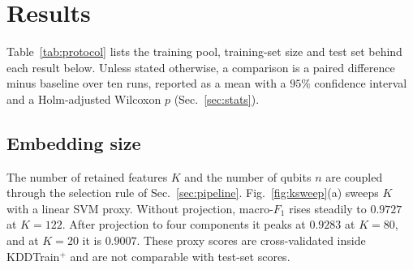 \section{Results}\label{sec:results}

Table~\ref{tab:protocol} lists the training pool, training-set size and test set behind each
result below. Unless stated otherwise, a comparison is a paired difference \QSVM{} minus
baseline over ten runs, reported as a mean with a $95\%$ confidence interval and a
Holm-adjusted Wilcoxon $p$ (Sec.~\ref{sec:stats}).

\subsection{Embedding size}\label{sec:res-embed}




The number of retained features $K$ and the number of qubits $n$ are coupled through the
selection rule of Sec.~\ref{sec:pipeline}. Fig.~\ref{fig:ksweep}(a) sweeps $K$ with a linear SVM
proxy. Without projection, macro-$F_1$ rises steadily to $0.9727$ at $K=122$. After projection to
four components it peaks at $0.9283$ at $K=80$, and at $K=20$ it is $0.9007$. These proxy scores
are cross-validated inside KDDTrain$^+$ and are not comparable with test-set scores.

